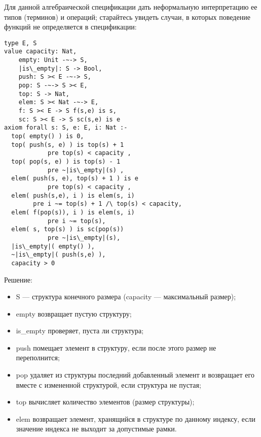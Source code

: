 

\z Для данной алгебраической спецификации дать неформальную интерпретацию ее типов (терминов) и операций; старайтесь увидеть случаи, в которых поведение функций не определяется в спецификации:
\begin{lstlisting}[escapechar={|}]
type E, S
value capacity: Nat,
    empty: Unit -~-> S,
    |is\_empty|: S -> Bool,
    push: S >< E -~-> S,
    pop: S -~-> S >< E,
    top: S -> Nat,
    elem: S >< Nat -~-> E,
    f: S >< E -> S f(s,e) is s,
    sc: S >< E -> S sc(s,e) is e
axiom forall s: S, e: E, i: Nat :-
  top( empty() ) is 0,
  top( push(s, e) ) is top(s) + 1
            pre top(s) < capacity ,
  top( pop(s, e) ) is top(s) - 1
            pre ~|is\_empty|(s) ,
  elem( push(s, e), top(s) + 1 ) is e
            pre top(s) < capacity ,
  elem( push(s,e), i ) is elem(s, i)
        pre i ~= top(s) + 1 /\ top(s) < capacity,
  elem( f(pop(s)), i ) is elem(s, i)
            pre i ~= top(s),
  elem( s, top(s) ) is sc(pop(s))
            pre ~|is\_empty|(s),
  |is\_empty|( empty() ),
  ~|is\_empty|( push(s,e) ),
  capacity > 0
\end{lstlisting}

Решение:
\begin{itemize}
  \item S --- структура конечного размера (capacity --- максимальный размер);
  \item empty возвращает пустую структуру;
  \item is\_empty проверяет, пуста ли структура;
  \item push помещает элемент в структуру, если после этого размер не переполнится;
  \item pop удаляет из структуры последний добавленный элемент и возвращает его вместе с измененной структурой, если структура не пустая;
  \item top вычисляет количество элементов (размер структуры);
  \item elem возвращает элемент, хранящийся в структуре по данному индексу, если значение индекса не выходит за допустимые рамки.
\end{itemize}

